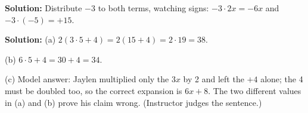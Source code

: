 \documentclass[12pt]{article}
\begin{document}
\textbf{Solution:} Distribute $-3$ to both terms, watching signs:
$-3 \cdot 2x = -6x$ and $-3 \cdot (-5) = +15$. 


\textbf{Solution:} (a) $2(3 \cdot 5 + 4) = 2(15 + 4) = 2 \cdot 19 = 38$. 

(b) $6 \cdot 5 + 4 = 30 + 4 = 34$. 

(c) Model answer: Jaylen multiplied only the $3x$ by 2 and left the $+4$ alone; the
4 must be doubled too, so the correct expansion is $6x + 8$. The two different
values in (a) and (b) prove his claim wrong. (Instructor judges the sentence.)
\end{document}
